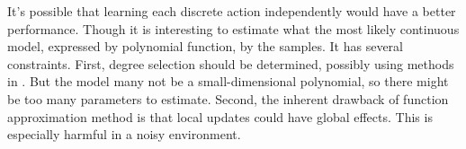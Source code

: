 \documentclass[10pt]{IEEEtran}
\begin{document}
It's possible that learning each discrete action independently would
have a better performance. Though it is interesting to estimate what
the most likely continuous model, expressed by polynomial function, by
the samples. It has several constraints. First, degree selection
should be determined, possibly using methods in
\cite{IJAIT08-stronger}. But the model many not be a small-dimensional
polynomial, so there might be too many parameters to estimate. Second,
the inherent drawback of function approximation method is that local
updates could have global effects. This is especially harmful in a
noisy environment.




\end{document}
